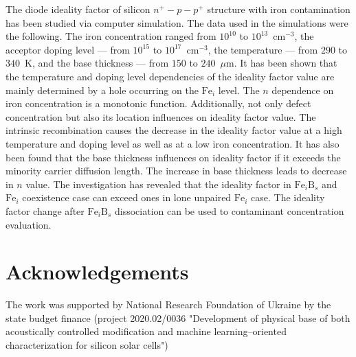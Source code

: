 \documentclass[12pt]{article}
\begin{document}
The diode ideality factor of silicon $n^+-p-p^+$ structure with iron contamination has been studied via computer simulation.
The data used in the simulations were the following.
The iron concentration ranged from $10^{10}$ to $10^{13}$~cm$^{-3}$,
the acceptor doping level --- from $10^{15}$ to $10^{17}$~cm$^{-3}$,
the temperature --- from $290$ to $340$~K,
and the base thickness --- from $150$ to $240$~$\mu$m.
It has been shown that the temperature and doping level dependencies of the ideality factor value
are mainly determined by a hole occurring on the $\mathrm{Fe}_i$ level.
The $n$ dependence on iron concentration is a monotonic function.
Additionally, not only defect concentration but also its location influences on  ideality factor value.
The intrinsic recombination causes the decrease in the ideality factor value at a high temperature and doping level as well as at a low iron concentration.
It has also been found that the base thickness influences on ideality factor if it exceeds the minority carrier diffusion length.
The increase in base thickness leads to decrease in $n$ value.
The investigation has revealed that the ideality factor in $\mathrm{Fe}_i\mathrm{B}_s$ and $\mathrm{Fe}_i$ coexistence case
can exceed ones in lone unpaired $\mathrm{Fe}_i$ case.
The ideality factor change after $\mathrm{Fe}_i\mathrm{B}_s$ dissociation can be used to contaminant concentration evaluation.


\section{Acknowledgements}

The work was supported by National Research Foundation  of Ukraine by the state budget finance
(project 2020.02/0036 "Development of physical base of both acoustically controlled modification and machine learning--oriented characterization for silicon solar cells")
\end{document}
